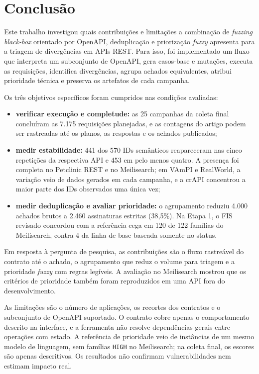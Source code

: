 \section{Conclusão}\label{sec:conclusoes}

Este trabalho investigou quais contribuições e limitações a combinação de
\textit{fuzzing} \textit{black-box} orientado por OpenAPI, deduplicação e
priorização \textit{fuzzy} apresenta para a triagem de divergências em APIs
REST. Para isso, foi implementado um fluxo que interpreta um subconjunto de
OpenAPI, gera casos-base e mutações, executa as requisições, identifica
divergências, agrupa achados equivalentes, atribui prioridade técnica e
preserva os artefatos de cada campanha.

Os três objetivos específicos foram cumpridos nas condições avaliadas:

\begin{itemize}
    \item \textbf{verificar execução e completude:} as 25 campanhas da coleta final
    concluíram as 7.175 requisições planejadas, e as contagens do artigo podem
    ser rastreadas até os planos, as respostas e os achados publicados;
    \item \textbf{medir estabilidade:} 441 dos 570 IDs semânticos reapareceram nas
    cinco repetições da respectiva API e 453 em pelo menos quatro. A presença
    foi completa no Petclinic REST e no Meilisearch; em VAmPI e RealWorld, a
    variação veio de dados gerados em cada campanha, e a crAPI concentrou a
    maior parte dos IDs observados uma única vez;
    \item \textbf{medir deduplicação e avaliar prioridade:} o agrupamento reduziu 4.000
    achados brutos a 2.460 assinaturas estritas (38,5\%). Na Etapa 1, o FIS
    revisado concordou com a referência cega em 120 de 122 famílias do
    Meilisearch, contra 4 da linha de base baseada somente no status.
\end{itemize}

Em resposta à pergunta de pesquisa, as contribuições são o fluxo rastreável
do contrato até o achado, o agrupamento que reduz o volume para triagem e a
prioridade \textit{fuzzy} com regras legíveis. A avaliação no Meilisearch
mostrou que os critérios de prioridade também foram reproduzidos em uma API
fora do desenvolvimento.

As limitações são o número de aplicações, os recortes dos contratos e o
subconjunto de OpenAPI suportado. O contrato cobre apenas o comportamento
descrito na interface, e a ferramenta não resolve dependências gerais entre
operações com estado. A referência de prioridade veio de instâncias de um
mesmo modelo de linguagem, sem famílias \texttt{HIGH} no Meilisearch; na
coleta final, os escores são apenas descritivos. Os resultados não confirmam
vulnerabilidades nem estimam impacto real.

